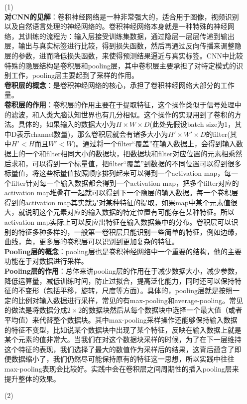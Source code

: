\documentclass[a4paper,UTF8]{article}
\numberwithin{equation}{section}
\begin{document}
\begin{enumerate}
\item [(1)]
~\\
\textbf{对CNN的见解}：卷积神经网络是一种非常强大的，适合用于图像，视频识别以及自然语言处理的神经网络的。卷积神经网络本身就是一种特殊的神经网络，其训练的流程为：输入层接受训练集数据，通过隐层一层层传递到输出层，输出与真实标签进行比较，得到损失函数，然后再通过反向传播来调整隐层的参数，进而降低损失函数，来使得预测结果逼近与真实标签。CNN中比较特殊的隐层结构是卷积层和pooling层，其中卷积层主要承担了对特定模式的识别工作，pooling层主要起到了采样的作用。\\
\textbf{卷积层的概念}：是卷积神经网络的核心，承担了卷积神经网络大部分的工作量。\\
\textbf{卷积层的作用}：卷积层的作用主要在于提取特征，这个操作类似于信号处理中的滤波，和人类大脑认知世界也有几分相似。这个操作的实现用到了卷积的方法。具体的，如果输入的数据大小为$H\times W\times D$(此处先假设batch size为1，其中D表示channel数量)，那么卷积层就会有诸多大小为$H'\times W'\times D$的filter(其中$H' < H$而且$W' < W$)。通过将一个filter“覆盖”在输入数据上，会得到输入数据上的一个和filter相同大小的数据块，把数据块和filter对应位置的元素相乘然后求和，可以得到一个标量值，把filter“覆盖”到数据的不同位置可以得到很多标量值，将这些标量值按照顺序排列起来可以得到一个activation map，每一个filter针对每一个输入数据都会得到一个activation map，把多个filter对应的activation map堆叠在一起就可以得到下一个隐层的输入数据。每一个卷积层得到的activation map其实就是对某种特征的提取，如果map中某个元素值很大，就说明这个元素对应的输入数据的特定位置有可能存在某种特征。所以activation map实际上可以反应出特征在输入数据集中的分布。卷积层可以识别的特征多种多样的，一般第一卷积层只能识别一些简单的特征，例如边缘，曲线，角，更多层的卷积层可以识别到更加复杂的特征。\\
\textbf{Pooling层的概念}：pooling层也是卷积神经网络中一个重要的结构，他的主要功能在于对数据进行采样。\\
\textbf{Pooling层的作用}：总体来讲pooling层的作用在于减少数据大小，减少参数，降低运算量，减低训练时间，防止过拟合，提高泛化能力，同时还可以保持特征的不变形（包括平移，旋转，尺度等方面）。具体的，pooling层就是按照一定的比例对输入数据进行采样，常见的有max-pooling和average-pooling。常见的做法是将数据分成$2\times 2$的数据块然后从每个数据块中选择一个最大值（或者平均值）来代替整个数据块。其中max-pooling采样操作还能够保持输入数据的特征不变型，比如说某个数据块中出现了某个特征，反映在输入数据上就是某个元素的值非常大。当我们在对这个数据块采样的时候，为了在下一层维持这个特征的表现，我们选择了最大的数值作为采样后的结果，这背后蕴含了即便数据缩小了，我们仍然尽可能保持原有的特征这一思想，所以实践中往往max-pooling表现会比较好。实践中会在卷积层之间周期性的插入pooling层来提升整体的效果。
	
\item [(2)]
~\\
	
\end{enumerate}
\end{document}
